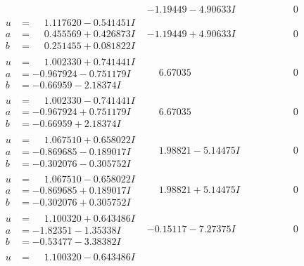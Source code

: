 \documentclass[1p]{elsarticle_modified}
\theoremstyle{definition}
\begin{document}
$$\begin{array}{c|c|c}
 & -1.19449 - 4.90633 I & \phantom{-0.000000 } 0 \\ \hline\begin{aligned}
u &= \phantom{-}1.117620 - 0.541451 I \\
a &= \phantom{-}0.455569 + 0.426873 I \\
b &= \phantom{-}0.251455 + 0.081822 I\end{aligned}
 & -1.19449 + 4.90633 I & \phantom{-0.000000 } 0 \\ \hline\begin{aligned}
u &= \phantom{-}1.002330 + 0.741441 I \\
a &= -0.967924 - 0.751179 I \\
b &= -0.66959 - 2.18374 I\end{aligned}
 & \phantom{-}6.67035\phantom{ +0.000000I} & \phantom{-0.000000 } 0 \\ \hline\begin{aligned}
u &= \phantom{-}1.002330 - 0.741441 I \\
a &= -0.967924 + 0.751179 I \\
b &= -0.66959 + 2.18374 I\end{aligned}
 & \phantom{-}6.67035\phantom{ +0.000000I} & \phantom{-0.000000 } 0 \\ \hline\begin{aligned}
u &= \phantom{-}1.067510 + 0.658022 I \\
a &= -0.869685 - 0.189017 I \\
b &= -0.302076 - 0.305752 I\end{aligned}
 & \phantom{-}1.98821 - 5.14475 I & \phantom{-0.000000 } 0 \\ \hline\begin{aligned}
u &= \phantom{-}1.067510 - 0.658022 I \\
a &= -0.869685 + 0.189017 I \\
b &= -0.302076 + 0.305752 I\end{aligned}
 & \phantom{-}1.98821 + 5.14475 I & \phantom{-0.000000 } 0 \\ \hline\begin{aligned}
u &= \phantom{-}1.100320 + 0.643486 I \\
a &= -1.82351 - 1.35338 I \\
b &= -0.53477 - 3.38382 I\end{aligned}
 & -0.15117 - 7.27375 I & \phantom{-0.000000 } 0 \\ \hline\begin{aligned}
u &= \phantom{-}1.100320 - 0.643486 I \\

\end{aligned}
\end{array}$$
\end{document}
